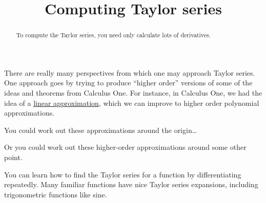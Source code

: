 \documentclass{ximera}
\title{Computing Taylor series}
\begin{document}
\begin{abstract}
  To compute the Taylor series, you need only calculate lots of derivatives.
\end{abstract}

\maketitle

There are really many perspectives from which one may approach Taylor series.  One approach goes by trying to produce ``higher order'' versions of some of the ideas and theorems from Calculus One.  For instance, in Calculus One, we had the idea of a \href{http://en.wikipedia.org/wiki/Linear_approximation}{linear approximation}, which we can improve to higher order polynomial approximations.


You could work out these approximations around the origin\ldots


Or you could work out these higher-order approximations around some other point.


You can learn how to find the Taylor series for a function by differentiating repeatedly.  Many familiar functions have nice Taylor series expansions, including trigonometric functions like sine.

\end{document}
